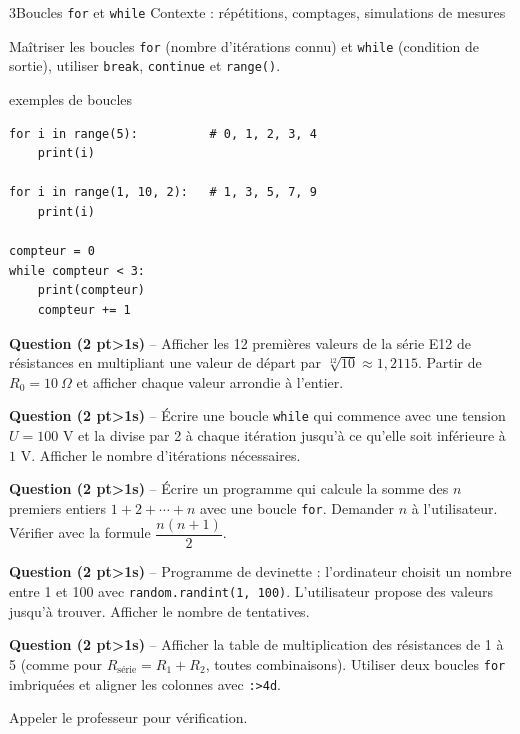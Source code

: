 \documentclass[11pt,a4paper]{article}
\newcommand{\cadreblanc}[1]{%
  \medskip\framebox[\linewidth][c]{\rule{0mm}{#1mm}}\par\medskip}
\newcounter{qnum}
\newcommand{\resetq}{\setcounter{qnum}{0}}
\newcommand{\q}[2]{%
  \stepcounter{qnum}%
  \noindent\textbf{Question \theqnum{} \normalfont(#2 pt\ifnum#2>1s\fi)} -- #1\par\smallskip}
\begin{document}
\clearpage
\resetq
\begin{tptitre}{3}{Boucles \texttt{for} et \texttt{while}}
  Contexte : répétitions, comptages, simulations de mesures
\end{tptitre}

\begin{objectifbox}{}
  Maîtriser les boucles \texttt{for} (nombre d'itérations connu) et \texttt{while} (condition de sortie), utiliser \texttt{break}, \texttt{continue} et \texttt{range()}.
\end{objectifbox}

\begin{codebox}{exemples de boucles}
\begin{lstlisting}
for i in range(5):          # 0, 1, 2, 3, 4
    print(i)

for i in range(1, 10, 2):   # 1, 3, 5, 7, 9
    print(i)

compteur = 0
while compteur < 3:
    print(compteur)
    compteur += 1
\end{lstlisting}
\end{codebox}

\q{Afficher les 12 premières valeurs de la série E12 de résistances en multipliant une valeur de départ par $\sqrt[12]{10} \approx 1{,}2115$. Partir de $R_0 = 10\ \Omega$ et afficher chaque valeur arrondie à l'entier.}{2}
\cadreblanc{24}

\q{Écrire une boucle \texttt{while} qui commence avec une tension $U = 100$ V et la divise par 2 à chaque itération jusqu'à ce qu'elle soit inférieure à $1$ V. Afficher le nombre d'itérations nécessaires.}{2}
\cadreblanc{24}

\q{Écrire un programme qui calcule la somme des $n$ premiers entiers $1 + 2 + \cdots + n$ avec une boucle \texttt{for}. Demander $n$ à l'utilisateur. Vérifier avec la formule $\dfrac{n(n+1)}{2}$.}{2}
\cadreblanc{22}

\q{Programme de devinette : l'ordinateur choisit un nombre entre 1 et 100 avec \texttt{random.randint(1, 100)}. L'utilisateur propose des valeurs jusqu'à trouver. Afficher le nombre de tentatives.}{2}
\cadreblanc{26}

\q{Afficher la table de multiplication des résistances de 1 à 5 (comme pour $R_{\text{série}} = R_1 + R_2$, toutes combinaisons). Utiliser deux boucles \texttt{for} imbriquées et aligner les colonnes avec \texttt{:>4d}.}{2}
\cadreblanc{24}

\begin{appelbox}
  \centering Appeler le professeur pour vérification.
\end{appelbox}
\end{document}
